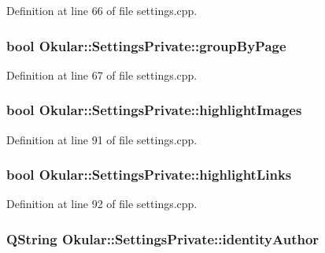 Definition at line 66 of file settings.\+cpp.

\hypertarget{classOkular_1_1SettingsPrivate_a9281d10efd51e2db1aca3b77486837da}{
\subsubsection[{group\+By\+Page}]{\setlength{\rightskip}{0pt plus 5cm}bool Okular\+::\+Settings\+Private\+::group\+By\+Page}}\label{classOkular_1_1SettingsPrivate_a9281d10efd51e2db1aca3b77486837da}


Definition at line 67 of file settings.\+cpp.

\hypertarget{classOkular_1_1SettingsPrivate_a9c5e6321acc2783dc74d13e212949f06}{
\subsubsection[{highlight\+Images}]{\setlength{\rightskip}{0pt plus 5cm}bool Okular\+::\+Settings\+Private\+::highlight\+Images}}\label{classOkular_1_1SettingsPrivate_a9c5e6321acc2783dc74d13e212949f06}


Definition at line 91 of file settings.\+cpp.

\hypertarget{classOkular_1_1SettingsPrivate_a60cd257eee44d96f790c173d05b187b8}{
\subsubsection[{highlight\+Links}]{\setlength{\rightskip}{0pt plus 5cm}bool Okular\+::\+Settings\+Private\+::highlight\+Links}}\label{classOkular_1_1SettingsPrivate_a60cd257eee44d96f790c173d05b187b8}


Definition at line 92 of file settings.\+cpp.

\hypertarget{classOkular_1_1SettingsPrivate_a98ccfc8d91cc610763eacca448467820}{
\subsubsection[{identity\+Author}]{\setlength{\rightskip}{0pt plus 5cm}Q\+String Okular\+::\+Settings\+Private\+::identity\+Author}}\label{classOkular_1_1SettingsPrivate_a98ccfc8d91cc610763eacca448467820}


